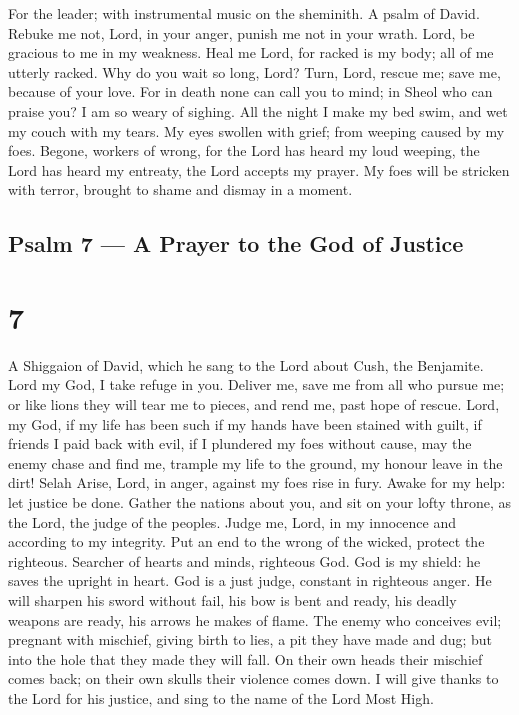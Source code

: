 For the leader; with instrumental music on the sheminith. A psalm of
David.  Rebuke me not, Lord, in your anger, punish me not in
your wrath.  Lord, be gracious to me in my weakness. Heal me
Lord, for racked is my body;  all of me utterly racked. Why
do you wait so long, Lord?  Turn, Lord, rescue me; save me,
because of your love.  For in death none can call you to
mind; in Sheol who can praise you?  I am so weary of
sighing. All the night I make my bed swim, and wet my couch with my
tears.  My eyes swollen with grief; from weeping caused by
my foes.  Begone, workers of wrong, for the Lord has heard
my loud weeping,  the Lord has heard my entreaty, the Lord
accepts my prayer.  My foes will be stricken with terror,
brought to shame and dismay in a moment.

\hypertarget{psalm-7-a-prayer-to-the-god-of-justice}{%
\subsection{Psalm 7 --- A Prayer to the God of
Justice}\label{psalm-7-a-prayer-to-the-god-of-justice}}

\hypertarget{section-6}{%
\section{7}\label{section-6}}

A Shiggaion of David, which he sang to the Lord about Cush, the
Benjamite.  Lord my God, I take refuge in you. Deliver me,
save me from all who pursue me;  or like lions they will
tear me to pieces, and rend me, past hope of rescue.  Lord,
my God, if my life has been such if my hands have been stained with
guilt,  if friends I paid back with evil, if I plundered my
foes without cause,  may the enemy chase and find me,
trample my life to the ground, my honour leave in the dirt! Selah
 Arise, Lord, in anger, against my foes rise in fury. Awake
for my help: let justice be done.  Gather the nations about
you, and sit on your lofty throne,  as the Lord, the judge
of the peoples. Judge me, Lord, in my innocence and according to my
integrity.  Put an end to the wrong of the wicked, protect
the righteous. Searcher of hearts and minds, righteous God.
 God is my shield: he saves the upright in heart.
 God is a just judge, constant in righteous anger.
 He will sharpen his sword without fail, his bow is bent
and ready,  his deadly weapons are ready, his arrows he
makes of flame.  The enemy who conceives evil; pregnant
with mischief, giving birth to lies,  a pit they have made
and dug; but into the hole that they made they will fall. 
On their own heads their mischief comes back; on their own skulls their
violence comes down.  I will give thanks to the Lord for
his justice, and sing to the name of the Lord Most High.

